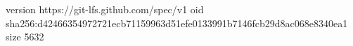 version https://git-lfs.github.com/spec/v1
oid sha256:d42466354972721ecb71159963d51efe0133991b7146fcb29d8ac068e8340ea1
size 5632
